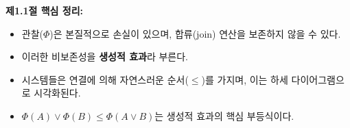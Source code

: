 \documentclass[11pt, a4paper, twoside, openany]{book}
\begin{document}
\begin{summarybox}
\textbf{제1.1절 핵심 정리:}
\begin{itemize}
  \item 관찰($\Phi$)은 본질적으로 손실이 있으며, 합류(join) 연산을 보존하지 않을 수 있다.
  \item 이러한 비보존성을 \textbf{생성적 효과}라 부른다.
  \item 시스템들은 연결에 의해 자연스러운 순서($\leq$)를 가지며, 이는 하세 다이어그램으로 시각화된다.
  \item $\Phi(A) \vee \Phi(B) \leq \Phi(A \vee B)$는 생성적 효과의 핵심 부등식이다.
\end{itemize}
\end{summarybox}
\end{document}

